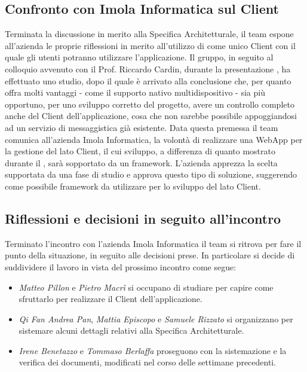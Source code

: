 \subsection{Confronto con Imola Informatica sul Client}
Terminata la discussione in merito alla Specifica Architetturale, il team espone all'azienda le proprie riflessioni in merito all'utilizzo di  come unico Client con il quale gli utenti potranno utilizzare l'applicazione. \newline
Il gruppo, in seguito al colloquio avvenuto con il Prof. Riccardo Cardin, durante la presentazione , ha effettuato uno studio, dopo il quale è arrivato alla conclusione che, per quanto  offra molti vantaggi - come il supporto nativo multidispositivo - sia più opportuno, per uno sviluppo corretto del progetto, avere un controllo completo anche del Client dell'applicazione, cosa che non sarebbe possibile appoggiandosi ad un servizio di messaggistica già esistente. \newline
Data questa premessa il team comunica all'azienda Imola Informatica, la volontà di realizzare una WebApp per la gestione del lato Client, il cui sviluppo, a differenza di quanto mostrato durante il , sarà sopportato da un framework. 
L'azienda apprezza la scelta supportata da una fase di studio e approva questo tipo di soluzione, suggerendo  come possibile framework da utilizzare per lo sviluppo del lato Client. 

\newpage
\subsection{Riflessioni e decisioni in seguito all'incontro}
Terminato l'incontro con l'azienda Imola Informatica il team si ritrova per fare il punto della situazione, in seguito alle decisioni prese. In particolare si decide di suddividere il lavoro in vista del prossimo incontro come segue: 
\begin{itemize}
    \item \textit{Matteo Pillon} e \textit{Pietro Macrì} si occupano di studiare  per capire come sfruttarlo per realizzare il Client dell'applicazione. 
    \item \textit{Qi Fan Andrea Pan}, \textit{Mattia Episcopo} e \textit{Samuele Rizzato} si organizzano per sistemare alcuni dettagli relativi alla Specifica Architetturale.
    \item \textit{Irene Benetazzo} e \textit{Tommaso Berlaffa} proseguono con la sistemazione e la verifica dei documenti, modificati nel corso delle settimane precedenti.
\end{itemize}